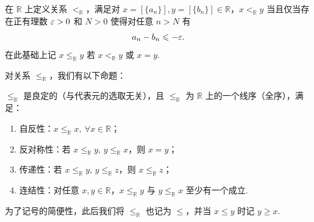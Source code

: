 \documentclass[../main.tex]{subfiles}
\begin{document}
\begin{definition} \label{def:order-R}
    在 $\mathbb R$ 上定义关系 $<_{\mathbb R}$，满足对 $x = [\{a_n\}], y = [\{b_n\}] \in \mathbb R$，$x <_{\mathbb R} y$ 当且仅当存在正有理数 $\varepsilon > 0$ 和 $N > 0$ 使得对任意 $n > N$ 有 
    $$
    a_n - b_n \leqslant -\varepsilon. 
    $$
    在此基础上记 $x \leqslant_{\mathbb R} y$ 若 $x <_{\mathbb R} y$ 或 $x = y$. 
\end{definition}

对关系 $\leqslant_{\mathbb R}$，我们有以下命题：

\begin{proposition} \label{prop:order-R}
    $\leqslant_{\mathbb R}$ 是良定的（与代表元的选取无关），且 $\leqslant_{\mathbb R}$ 为 $\mathbb R$ 上的一个线序（全序），满足：
    \begin{enumerate}[label=(\alph*)]
        \item 自反性：$x \leqslant_{\mathbb R} x,\ \forall x \in \mathbb R$；
        \item 反对称性：若 $x \leqslant_{\mathbb R} y,\, y \leqslant_{\mathbb R} x$，则 $x = y$；
        \item 传递性：若 $x \leqslant_{\mathbb R} y,\, y \leqslant_{\mathbb R} z$，则 $x \leqslant_{\mathbb R} z$；
        \item 连结性：对任意 $x, y \in \mathbb R$，$x \leqslant_{\mathbb R} y$ 与 $y \leqslant_{\mathbb R} x$ 至少有一个成立. 
    \end{enumerate}
\end{proposition}

\begin{remark}
    为了记号的简便性，此后我们将 $\leqslant_\mathbb R$ 也记为 $\leqslant$，并当 $x \leqslant y$ 时记 $y \geqslant x$. 
\end{remark}
\end{document}
